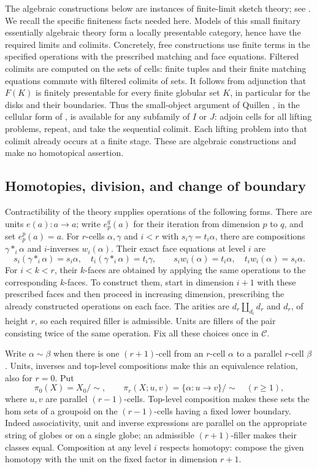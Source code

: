 The algebraic constructions below are instances of finite-limit sketch
theory; see \cite[Section~4.4, Theorems~1, 2 and~4]{BarrWells1985}.
We recall the specific finiteness facts needed here.  Models of this small
finitary essentially algebraic theory form a locally presentable
category, hence have the required limits and colimits.  Concretely,
free constructions use finite terms in the specified operations with
the prescribed matching and face equations.  Filtered colimits are
computed on the sets of cells: finite tuples and their finite matching
equations commute with filtered colimits of sets.  It follows from
adjunction that $F(K)$ is finitely presentable for every finite globular
set $K$, in particular for the disks and their boundaries.  Thus the
small-object argument of Quillen \cite{Quillen1967}, in the cellular
form of \cite[Theorem~2.1.14 and Corollary~2.1.15]{Hovey1999}, is
available for any subfamily of $I$ or $J$: adjoin cells for all lifting
problems, repeat, and take the
sequential colimit.  Each lifting problem into that colimit already
occurs at a finite stage.  These are algebraic constructions and make
no homotopical assertion.

\subsection{Homotopies, division, and change of boundary}

Contractibility of the theory supplies operations of the following
forms.  There are units $e(a):a\to a$; write $e_p^q(a)$ for their
iteration from dimension $p$ to $q$, and set $e_p^p(a)=a$.  For
$r$-cells $\alpha,\gamma$ and $i<r$ with $s_i\gamma=t_i\alpha$,
there are compositions $\gamma*_i\alpha$ and $i$-inverses
$w_i(\alpha)$.  Their exact face equations at level $i$ are
\[
 s_i(\gamma*_i\alpha)=s_i\alpha,\quad
 t_i(\gamma*_i\alpha)=t_i\gamma,\qquad
 s_iw_i(\alpha)=t_i\alpha,\quad t_iw_i(\alpha)=s_i\alpha.
\]
For $i<k<r$, their $k$-faces are obtained by applying the same
operations to the corresponding $k$-faces.  To construct them, start
in dimension $i+1$ with these prescribed faces and then proceed in
increasing dimension, prescribing the already constructed operations
on each face.  The arities are $d_r\amalg_{d_i}d_r$ and $d_r$, of
height $r$, so each required filler is admissible.  Units are fillers
of the pair consisting twice of the same operation.  Fix all these
choices once in $\mathcal C$.

Write $\alpha\sim\beta$ when there is one $(r+1)$-cell from an
$r$-cell $\alpha$ to a parallel $r$-cell $\beta$.  Units, inverses and
top-level compositions make this an equivalence relation, also for
$r=0$.  Put
\[
 \pi_0(X)=X_0/{\sim},\qquad
 \pi_r(X;u,v)=\{\alpha:u\to v\}/{\sim}\quad(r\ge1),
\]
where $u,v$ are parallel $(r-1)$-cells.  Top-level composition makes
these sets the hom sets of a groupoid on the $(r-1)$-cells having a
fixed lower boundary.  Indeed associativity, unit and inverse
expressions are parallel on the appropriate string of globes or on
a single globe; an admissible $(r+1)$-filler makes their classes equal.
Composition at any level $i$ respects homotopy: compose the given
homotopy with the unit on the fixed factor in dimension $r+1$.

